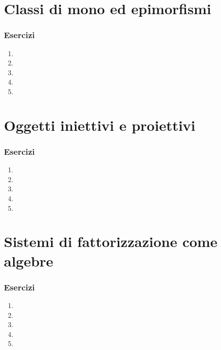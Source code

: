 \section[Mono ed epimorfismi]{Classi di mono ed epimorfismi}
\subsubsection*{Esercizi}
\begin{enumerate}
	\item
	\item
	\item
	\item
	\item
\end{enumerate}
\section[Iniettivi e proiettivi]{Oggetti iniettivi e proiettivi}
\subsubsection*{Esercizi}
\begin{enumerate}
	\item
	\item
	\item
	\item
	\item
\end{enumerate}
\section[Fattorizzazione e algebre]{Sistemi di fattorizzazione come algebre}
\subsubsection*{Esercizi}
\begin{enumerate}
	\item
	\item
	\item
	\item
	\item
\end{enumerate}

